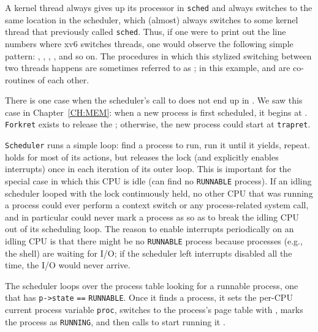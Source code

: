 A kernel thread always gives up its
processor in
\lstinline{sched} 
and always switches to the same location in the scheduler, which
(almost) always switches to some kernel thread that previously called
\lstinline{sched}. 
Thus, if one were to print out the line numbers where xv6 switches
threads, one would observe the following simple pattern:
,
,
,
,
and so on.  The procedures in which this stylized switching between
two threads happens are sometimes referred to as 
; 
in this example,
and
are co-routines of each other.

There is one case when the scheduler's call to
does not end up in
.
We saw this case in Chapter~\ref{CH:MEM}: when a
new process is first scheduled, it begins at
.
\lstinline{Forkret}
exists to release the 
;
otherwise, the new process could start at
\lstinline{trapret}.

\lstinline{Scheduler}
runs a simple loop:
find a process to run, run it until it yields, repeat.
holds
for most of its actions,
but releases the lock (and explicitly enables interrupts)
once in each iteration of its outer loop.
This is important for the special case in which this CPU
is idle (can find no
\lstinline{RUNNABLE}
process).
If an idling scheduler looped with
the lock continuously held, no other CPU that
was running a process could ever perform a context
switch or any process-related system call,
and in particular could never mark a process as
so as to break the idling CPU out of its scheduling loop.
The reason to enable interrupts periodically on an idling
CPU is that there might be no
\lstinline{RUNNABLE}
process because processes (e.g., the shell) are
waiting for I/O;
if the scheduler left interrupts disabled all the time,
the I/O would never arrive.

The scheduler
loops over the process table
looking for a runnable process, one that has
\lstinline{p->state} 
\lstinline{==}
\lstinline{RUNNABLE}.
Once it finds a process, it sets the per-CPU current process
variable
\lstinline{proc},
switches to the process's page table with
,
marks the process as
\lstinline{RUNNING},
and then calls
to start running it
.

